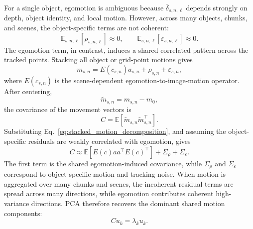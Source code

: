 \documentclass[letterpaper]{article} %
\begin{document}
For a single object, egomotion is ambiguous because $\bar{\delta}_{s,n,\ell}$ depends strongly on depth, object identity, and local motion. However, across many objects, chunks, and scenes, the object-specific terms are not coherent:
\begin{equation}
    \mathbb{E}_{s,n,\ell}[\rho_{s,n,\ell}]
    \approx 0,
    \qquad
    \mathbb{E}_{s,n,\ell}[\varepsilon_{s,n,\ell}]
    \approx 0.
\end{equation}
The egomotion term, in contrast, induces a shared correlated pattern across the tracked points. Stacking all object or grid-point motions gives
\begin{equation}
    m_{s,n}
    =
    E(c_{s,n})a_{s,n}
    +
    \rho_{s,n}
    +
    \varepsilon_{s,n},
    \label{eq:stacked_motion_decomposition}
\end{equation}
where $E(c_{s,n})$ is the scene-dependent egomotion-to-image-motion operator. After centering,
\begin{equation}
    \tilde m_{s,n}=m_{s,n}-m_0,
\end{equation}
the covariance of the movement vectors is
\begin{equation}
    C
    =
    \mathbb{E}\left[\tilde m_{s,n}\tilde m_{s,n}^{\top}\right].
\end{equation}
Substituting Eq.~\eqref{eq:stacked_motion_decomposition}, and assuming the object-specific residuals are weakly correlated with egomotion, gives
\begin{equation}
    C
    \approx
    \mathbb{E}\left[
        E(c)a a^\top E(c)^\top
    \right]
    +
    \Sigma_{\rho}
    +
    \Sigma_{\varepsilon}.
    \label{eq:motion_covariance_decomposition}
\end{equation}
The first term is the shared egomotion-induced covariance, while $\Sigma_{\rho}$ and $\Sigma_{\varepsilon}$ correspond to object-specific motion and tracking noise. When motion is aggregated over many chunks and scenes, the incoherent residual terms are spread across many directions, while egomotion contributes coherent high-variance directions. PCA therefore recovers the dominant shared motion components:
\begin{equation}
    C u_k = \lambda_k u_k.
\end{equation}
\end{document}
